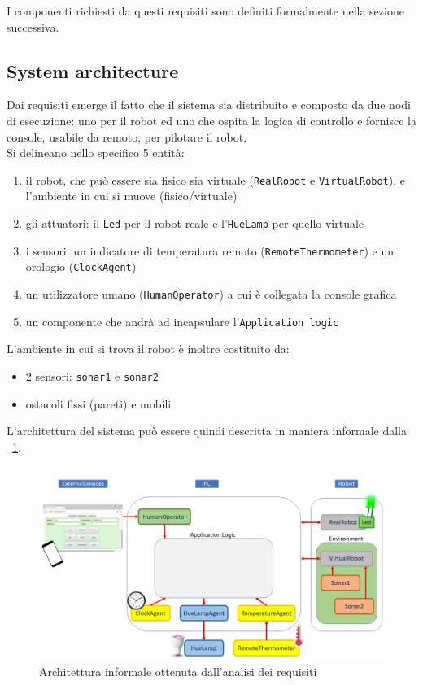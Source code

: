 \documentclass{../llncs}
\newcommand{\code}[1]{{\color{blue}\small{\texttt{#1}}}}
\newcommand{\labelfig}[1]{\label{fig:#1}}
\newcommand{\xf}[1]{\figurename~\ref{fig:#1}}
\begin{document}
I componenti richiesti da questi requisiti sono definiti formalmente nella sezione successiva.

\subsection{System architecture}
Dai requisiti emerge il fatto che il sistema sia distribuito e composto da due nodi di esecuzione: uno per il robot ed uno che ospita la logica di controllo e fornisce la console, usabile da remoto, per pilotare il robot.\\

\noindent Si delineano nello specifico 5 entità:
\begin{enumerate}
\item il robot, che può essere sia fisico sia virtuale (\texttt{RealRobot} e \texttt{VirtualRobot}), e l'ambiente in cui si muove (fisico/virtuale)
\item gli attuatori: il \texttt{Led} per il robot reale e l'\texttt{HueLamp} per quello virtuale
\item i sensori: un indicatore di temperatura remoto (\texttt{RemoteThermometer}) e un orologio (\texttt{ClockAgent})
\item un utilizzatore umano (\texttt{HumanOperator}) a cui è collegata la console grafica
\item un componente che andrà ad incapsulare l'\texttt{Application logic}
\end{enumerate}

\noindent L'ambiente in cui si trova il robot è inoltre costituito da:
\begin{itemize}[label={--}]
\item 2 sensori: \code{sonar1} e \code{sonar2} %
\item ostacoli fissi (pareti) e mobili
\end{itemize}

L'architettura del sistema può essere quindi descritta in maniera informale dalla \xf{informalRA}.
\begin{figure}[!htb]
\centering
\includegraphics[scale=0.4]{img/informalArchitecture1.png}
\caption{Architettura informale ottenuta dall'analisi dei requisiti}\labelfig{informalRA}
\end{figure}
\end{document}
